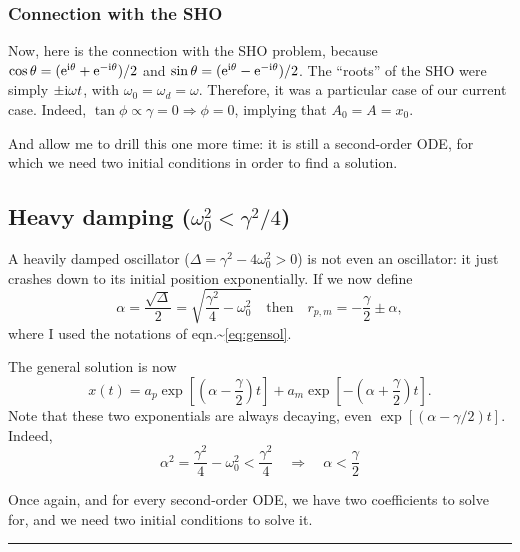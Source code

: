 \documentclass[11pt]{article}
\begin{document}
    \hypertarget{connection-with-the-sho}{%
\subsubsection{Connection with the SHO}\label{connection-with-the-sho}}

    Now, here is the connection with the SHO problem, because
\(\cos\theta = (\textrm{e}^{\mathrm i\theta} + \textrm{e}^{-\mathrm i\theta})/2\) and
\(\sin\theta = (\textrm{e}^{\mathrm i\theta} - \textrm{e}^{-\mathrm i\theta})/2\). The
``roots'' of the SHO were simply \(\pm\mathrm i\omega t\), with
\(\omega_0 = \omega_d = \omega\). Therefore, it was a particular case of
our current case. Indeed,
\(\tan\phi \propto \gamma =0 \Rightarrow \phi = 0\), implying that
\(A_0 = A = x_0\).

And allow me to drill this one more time: it is still a second-order
ODE, for which we need two initial conditions in order to find a
solution.

    \hypertarget{heavy-damping-omega_02-gamma24}{%
\subsection{\texorpdfstring{Heavy damping
(\(\omega_0^2 < \gamma^2/4\))}{Heavy damping (\textbackslash{}omega\_0\^{}2 \textless{} \textbackslash{}gamma\^{}2/4)}}\label{heavy-damping-omega_02-gamma24}}

    A heavily damped oscillator (\(\Delta = \gamma^2 - 4\omega_0^2 >0\)) is
not even an oscillator: it just crashes down to its initial position
exponentially. If we now define
\[ \alpha = \frac{\sqrt{\Delta}}2 = \sqrt{\frac{\gamma^2}4  - \omega_0^2}\quad\textrm{then} \quad r_{p,m} = -\frac{\gamma}2 \pm \alpha,\]
where I used the notations of eqn.\textasciitilde{}\eqref{eq:gensol}.

The general solution is now
\[ x(t) = a_p \exp\left[\left(\alpha - \frac\gamma2\right)t\right] + a_m \exp\left[-\left(\alpha + \frac\gamma2\right)t\right]. \]
Note that these two exponentials are always decaying, even
\(\exp[(\alpha - \gamma/2)t]\). Indeed,
\[ \alpha^2 = \frac{\gamma^2}4 - \omega_0^2 < \frac{\gamma^2}4 \quad \Rightarrow \quad \alpha < \frac{\gamma} 2\]

    Once again, and for every second-order ODE, we have two coefficients to
solve for, and we need two initial conditions to solve it.

\begin{center}\rule{0.5\linewidth}{\linethickness}\end{center}
\end{document}
